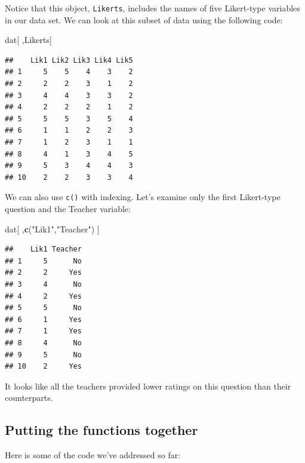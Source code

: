 \documentclass[
]{article}
\newenvironment{Shaded}{\begin{snugshade}}{\end{snugshade}}
\newcommand{\KeywordTok}[1]{\textcolor[rgb]{0.13,0.29,0.53}{\textbf{#1}}}
\newcommand{\NormalTok}[1]{#1}
\newcommand{\StringTok}[1]{\textcolor[rgb]{0.31,0.60,0.02}{#1}}
\begin{document}
Notice that this object, \texttt{Likerts}, includes the names of five Likert-type variables in our data set. We can look at this subset of data using the following code:

\begin{Shaded}
\begin{Highlighting}[]
\NormalTok{dat[ ,Likerts]}
\end{Highlighting}
\end{Shaded}

\begin{verbatim}
##    Lik1 Lik2 Lik3 Lik4 Lik5
## 1     5    5    4    3    2
## 2     2    2    3    1    2
## 3     4    4    3    3    2
## 4     2    2    2    1    2
## 5     5    5    3    5    4
## 6     1    1    2    2    3
## 7     1    2    3    1    1
## 8     4    1    3    4    5
## 9     5    3    4    4    3
## 10    2    2    3    3    4
\end{verbatim}

We can also use \texttt{c()} with indexing. Let's examine only the first Likert-type question and the Teacher variable:

\begin{Shaded}
\begin{Highlighting}[]
\NormalTok{dat[ ,}\KeywordTok{c}\NormalTok{(}\StringTok{"Lik1"}\NormalTok{,}\StringTok{"Teacher"}\NormalTok{) ]}
\end{Highlighting}
\end{Shaded}

\begin{verbatim}
##    Lik1 Teacher
## 1     5      No
## 2     2     Yes
## 3     4      No
## 4     2     Yes
## 5     5      No
## 6     1     Yes
## 7     1     Yes
## 8     4      No
## 9     5      No
## 10    2     Yes
\end{verbatim}

It looks like all the teachers provided lower ratings on this question than their counterparts.

\hypertarget{putting-the-functions-together}{%
\subsection{Putting the functions together}\label{putting-the-functions-together}}

Here is some of the code we've addressed so far:
\end{document}
